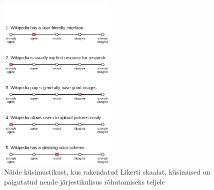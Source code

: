 \documentclass[a4paper]{article}
\begin{document}
\begin{figure}[H]
\centering
\includegraphics[width=0.5\textwidth, height = 0.7\textwidth]{Example_Likert_Scale.png}
\caption{Näide k\"usimustikust, kus rakendatud Likerti skaalat, k\"usimused on paigutatud nende järjestikulisus rõhutamiseks teljele\cite{Smith}}
\label{likert2}
\end{figure}

\pagebreak
{}

\end{document}
